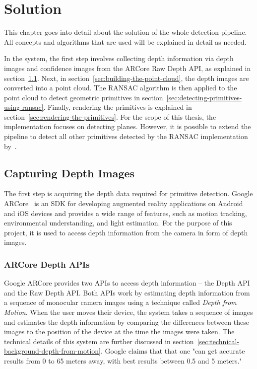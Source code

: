 \chapter{Solution}

This chapter goes into detail about the solution of the whole detection pipeline.
All concepts and algorithms that are used will be explained in detail as needed.

In the system, the first step involves collecting depth information via depth images and confidence images from the ARCore Raw Depth API, as explained in section~\ref{sec:capturing-depth-images}.
Next, in section~\ref{sec:building-the-point-cloud}, the depth images are converted into a point cloud.
The RANSAC algorithm is then applied to the point cloud to detect geometric primitives in section~\ref{sec:detecting-primitives-using-ransac}.
Finally, rendering the primitives is explained in section~\ref{sec:rendering-the-primitives}.
For the scope of this thesis, the implementation focuses on detecting planes.
However, it is possible to extend the pipeline to detect all other primitives detected by the RANSAC implementation by~\cite{schnabel_efficient_2007}.

%


\section{Capturing Depth Images}\label{sec:capturing-depth-images}
The first step is acquiring the depth data required for primitive detection.
Google ARCore~\parencite{google_llc_arcore_doc} is an SDK for developing augmented reality applications on Android and iOS devices
and provides a wide range of features, such as motion tracking, environmental understanding, and light estimation.
For the purpose of this project, it is used to access depth information from the camera in form of depth images.

\subsection{ARCore Depth APIs}
Google ARCore provides two APIs to access depth information -- the Depth API and the Raw Depth API\@.
Both APIs work by estimating depth information from a sequence of monocular camera images using
a technique called \textit{Depth from Motion}.
When the user moves their device, the system takes a sequence of images and
estimates the depth information by comparing the differences between these images to the position of the device at the time the images were taken.
The technical details of this system are further discussed in section~\ref{sec:technical-background-depth-from-motion}.
Google claims that that one "can get accurate results from 0 to 65 meters away,
with best results between 0.5 and 5 meters."~\parencite{google_llc_arcore_doc}

